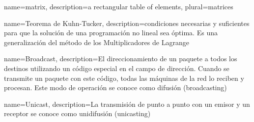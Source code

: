 {name={matrix},%
 description={a rectangular table of elements},%
 plural={matrices}%
} 

{name={Teorema de Kuhn-Tucker}, 
description={condiciones necesarias y suficientes para que la solución de una programación  no lineal sea óptima. Es una generalización del método de los Multiplicadores de Lagrange}
}

{
name={Broadcast},
description={El direccionamiento de un paquete
a todos los destinos utilizando un código especial en el campo de dirección. Cuando se transmite
un paquete con este código, todas las máquinas de la red lo reciben y procesan. Este modo de operación
se conoce como difusión (broadcasting)}
}

{
name={Unicast},
description={La transmisión de punto a punto con un emisor y un receptor se conoce como unidifusión (unicasting)}
}
